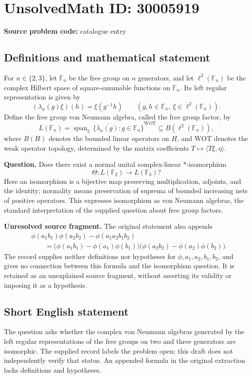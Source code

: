 \documentclass[11pt]{article}
\newcommand{\C}{\mathbb{C}}
\begin{document}
\section*{UnsolvedMath ID: 30005919}
\textbf{Source problem code:} catalogue entry
\subsection{Definitions and mathematical statement}
For \(n\in\{2,3\}\), let \(\mathbb F_n\) be the free group on \(n\) generators, and let \(\ell^2(\mathbb F_n)\) be the complex Hilbert space of square-summable functions on \(\mathbb F_n\). Its left regular representation is given by
\[
(\lambda_n(g)\xi)(h)=\xi(g^{-1}h)
\qquad(g,h\in\mathbb F_n,\ \xi\in\ell^2(\mathbb F_n)).
\]
Define the free group von Neumann algebra, called the free group factor, by
\[
L(\mathbb F_n)=\overline{\operatorname{span}_{\C}\{\lambda_n(g):g\in\mathbb F_n\}}^{\mathrm{WOT}}
\subseteq B(\ell^2(\mathbb F_n)),
\]
where \(B(H)\) denotes the bounded linear operators on \(H\), and \(\mathrm{WOT}\) denotes the weak operator topology, determined by the matrix coefficients \(T\mapsto\langle T\xi,\eta\rangle\).

\textbf{Question.} Does there exist a normal unital complex-linear \(*\)-isomorphism
\[
\Theta:L(\mathbb F_2)\longrightarrow L(\mathbb F_3)?
\]
Here an isomorphism is a bijective map preserving multiplication, adjoints, and the identity; normality means preservation of suprema of bounded increasing nets of positive operators. This expresses isomorphism as von Neumann algebras, the standard interpretation of the supplied question about free group factors.

\textbf{Unresolved source fragment.} The original statement also appends
\[
\begin{aligned}
&\phi(a_1b_1)\phi(a_2b_2)-\phi(a_1a_2b_1b_2)\\
&\qquad=\bigl(\phi(a_1b_1)-\phi(a_1)\phi(b_1)\bigr)
\bigl(\phi(a_2b_2)-\phi(a_2)\phi(b_2)\bigr).
\end{aligned}
\]
The record supplies neither definitions nor hypotheses for \(\phi,a_1,a_2,b_1,b_2\), and gives no connection between this formula and the isomorphism question. It is retained as an unexplained source fragment, without asserting its validity or imposing it as a hypothesis.
\subsection{Short English statement}
The question asks whether the complex von Neumann algebras generated by the left regular representations of the free groups on two and three generators are isomorphic. The supplied record labels the problem open; this draft does not independently verify that status. An appended formula in the original extraction lacks definitions and hypotheses.
\end{document}
